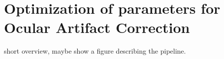 \section{Optimization of parameters for Ocular Artifact Correction}
short overview, maybe show a figure describing the pipeline.